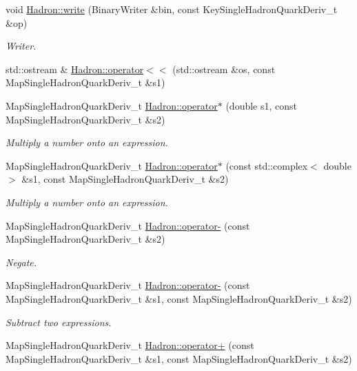 \begin{DoxyCompactItemize}
void \mbox{\hyperlink{namespaceHadron_a3d7c7b8fcc5310fee44294d5900816fb}{Hadron\+::write}} (Binary\+Writer \&bin, const Key\+Single\+Hadron\+Quark\+Deriv\+\_\+t \&op)
\begin{DoxyCompactList}\small\item\em Writer. \end{DoxyCompactList}\item 
std\+::ostream \& \mbox{\hyperlink{namespaceHadron_a800dbac093bd07f370068965de5868b3}{Hadron\+::operator$<$$<$}} (std\+::ostream \&os, const Map\+Single\+Hadron\+Quark\+Deriv\+\_\+t \&s1)
\item 
Map\+Single\+Hadron\+Quark\+Deriv\+\_\+t \mbox{\hyperlink{namespaceHadron_a559c56047e1679b244bd6770b9f3c3b8}{Hadron\+::operator$\ast$}} (double s1, const Map\+Single\+Hadron\+Quark\+Deriv\+\_\+t \&s2)
\begin{DoxyCompactList}\small\item\em Multiply a number onto an expression. \end{DoxyCompactList}\item 
Map\+Single\+Hadron\+Quark\+Deriv\+\_\+t \mbox{\hyperlink{namespaceHadron_aee77eafb416d7080a53fa0bd52528d11}{Hadron\+::operator$\ast$}} (const std\+::complex$<$ double $>$ \&s1, const Map\+Single\+Hadron\+Quark\+Deriv\+\_\+t \&s2)
\begin{DoxyCompactList}\small\item\em Multiply a number onto an expression. \end{DoxyCompactList}\item 
Map\+Single\+Hadron\+Quark\+Deriv\+\_\+t \mbox{\hyperlink{namespaceHadron_a3420e25a6674cbce229ba6b98f1fa85a}{Hadron\+::operator-\/}} (const Map\+Single\+Hadron\+Quark\+Deriv\+\_\+t \&s2)
\begin{DoxyCompactList}\small\item\em Negate. \end{DoxyCompactList}\item 
Map\+Single\+Hadron\+Quark\+Deriv\+\_\+t \mbox{\hyperlink{namespaceHadron_a064800b32b071a140c16ef8416cfa165}{Hadron\+::operator-\/}} (const Map\+Single\+Hadron\+Quark\+Deriv\+\_\+t \&s1, const Map\+Single\+Hadron\+Quark\+Deriv\+\_\+t \&s2)
\begin{DoxyCompactList}\small\item\em Subtract two expressions. \end{DoxyCompactList}\item 
Map\+Single\+Hadron\+Quark\+Deriv\+\_\+t \mbox{\hyperlink{namespaceHadron_afa83538fb097946f87e6f98180c378b5}{Hadron\+::operator+}} (const Map\+Single\+Hadron\+Quark\+Deriv\+\_\+t \&s1, const Map\+Single\+Hadron\+Quark\+Deriv\+\_\+t \&s2)

\end{DoxyCompactItemize}
